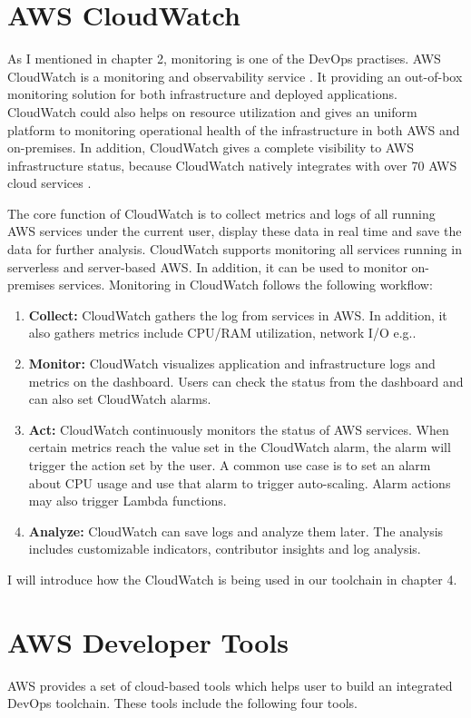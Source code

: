 \section{AWS CloudWatch}
As I mentioned in chapter 2, monitoring is one of the DevOps practises. AWS CloudWatch is a monitoring and observability service \cite{AmazonCl65:online}. It providing an out-of-box monitoring solution for both infrastructure and deployed applications. CloudWatch could also helps on resource utilization and gives an uniform platform to monitoring operational health of the infrastructure in both AWS and on-premises. In addition, CloudWatch gives a complete visibility to AWS infrastructure status, because CloudWatch natively integrates with over 70 AWS cloud services \cite{AmazonCl65:online}.
\par
The core function of CloudWatch is to collect metrics and logs of all running AWS services under the current user, display these data in real time and save the data for further analysis.
CloudWatch supports monitoring all services running in serverless and server-based AWS. In addition, it can be used to monitor on-premises services. Monitoring in CloudWatch follows the following workflow:
\begin{enumerate}
    \item \textbf{Collect:} CloudWatch gathers the log from services in AWS. In addition, it also gathers metrics include CPU/RAM utilization, network I/O e.g..
    \item \textbf{Monitor:} CloudWatch visualizes application and infrastructure logs and metrics on the dashboard. Users can check the status from the dashboard and can also set CloudWatch alarms.
    \item \textbf{Act:} CloudWatch continuously monitors the status of AWS services.
    When certain metrics reach the value set in the CloudWatch alarm, the alarm will trigger the action set by the user. A common use case is to set an alarm about CPU usage and use that alarm to trigger auto-scaling. Alarm actions may also trigger Lambda functions.
    \item \textbf{Analyze:} CloudWatch can save logs and analyze them later. The analysis includes customizable indicators, contributor insights and log analysis.
\end{enumerate}
I will introduce how the CloudWatch is being used in our toolchain in chapter 4.
\section{AWS Developer Tools}
AWS provides a set of cloud-based tools which helps user to build an integrated DevOps toolchain. These tools include the following four tools.
